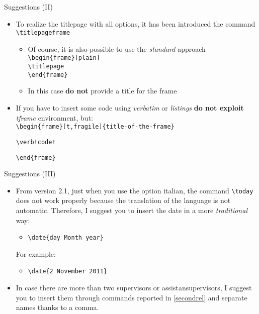 \begin{frame}[fragile]{Suggestions (II)}
\begin{itemize}
\item To realize the titlepage with all options, it has been introduced the command \verb!\titlepageframe!
\begin{itemize}
\item Of course, it is also possible to use the \emph{standard} approach\\
\verb!\begin{frame}[plain]!\\
\verb!\titlepage! \\
\verb!\end{frame}!
\item In this case \textbf{do not} provide a title for the frame
\end{itemize}
\item If you have to insert some code using \emph{verbatim} or \emph{listings} \textbf{do not exploit} \emph{tframe} environment, but:\\
\verb!\begin{frame}[t,fragile]{title-of-the-frame}!
\begin{verbatim}
\verb!code!
\end{verbatim}
\verb!\end{frame}!
\end{itemize}
\end{frame}

\begin{frame}[t,fragile]{Suggestions (III)}
\begin{itemize}
\item From version 2.1, just when you use the option  italian, the command \verb!\today! does not work properly because the translation of the language is not automatic. Therefore, I suggest you to insert the date in a more \emph{traditional} way:
\begin{itemize}
\item \verb!\date{day Month year}!
\end{itemize}
For example:
\begin{itemize}
\item \verb!\date{2 November 2011}!
\end{itemize}
\item In case there are more than two supervisors or assistansupervisors, I suggest you to insert them through commands reported in \ref{secondrel} and separate names thanks to a comma.
\end{itemize}
\end{frame}

